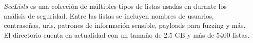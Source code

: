 \textit{SecLists}\cite{seclists} es una colección de múltiples tipos de listas usadas en durante los análisis de seguridad. Entre las listas se incluyen nombres de usuarios, contraseñas, \acrshort{url}s, patrones de información sensible, payloads para fuzzing y más.\\

El directorio cuenta en actualidad con un tamaño de 2.5 GB y más de 5400 listas.